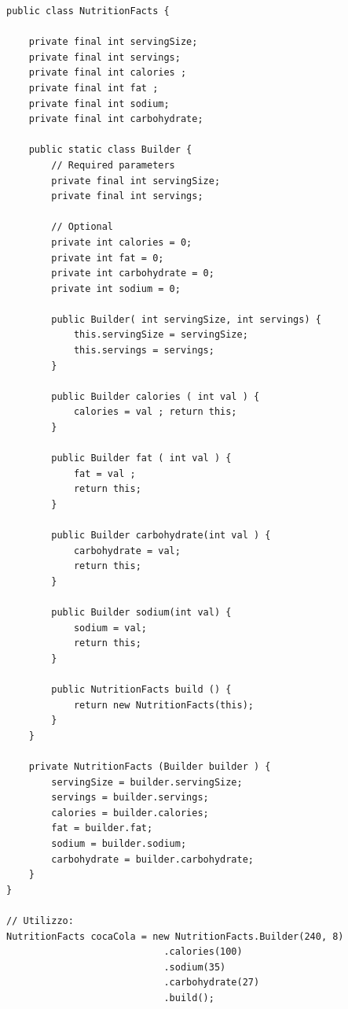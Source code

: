 \begin{verbatim}
public class NutritionFacts { 

    private final int servingSize; 
    private final int servings; 
    private final int calories ; 
    private final int fat ; 
    private final int sodium; 
    private final int carbohydrate; 
    
    public static class Builder { 
        // Required parameters 
        private final int servingSize; 
        private final int servings; 
        
        // Optional 
        private int calories = 0; 
        private int fat = 0; 
        private int carbohydrate = 0; 
        private int sodium = 0; 
        
        public Builder( int servingSize, int servings) { 
            this.servingSize = servingSize; 
            this.servings = servings; 
        } 
        
        public Builder calories ( int val ) { 
            calories = val ; return this;
        } 
        
        public Builder fat ( int val ) { 
            fat = val ; 
            return this; 
        } 
        
        public Builder carbohydrate(int val ) {
            carbohydrate = val; 
            return this; 
        } 
        
        public Builder sodium(int val) { 
            sodium = val; 
            return this; 
        } 
        
        public NutritionFacts build () { 
            return new NutritionFacts(this); 
        } 
    }
    
    private NutritionFacts (Builder builder ) { 
        servingSize = builder.servingSize; 
        servings = builder.servings; 
        calories = builder.calories; 
        fat = builder.fat;
        sodium = builder.sodium; 
        carbohydrate = builder.carbohydrate;
    }
}

// Utilizzo:
NutritionFacts cocaCola = new NutritionFacts.Builder(240, 8)
                            .calories(100)
                            .sodium(35)
                            .carbohydrate(27)
                            .build();

\end{verbatim}


\newpage